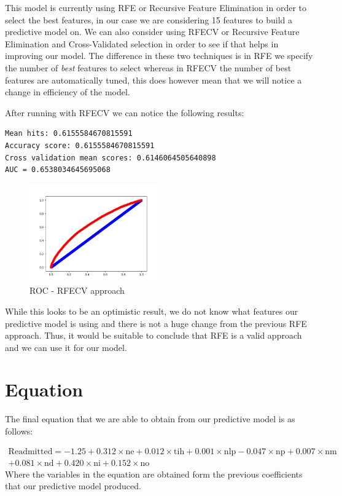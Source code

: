 \documentclass[11pt]{report}
\newcommand{\linespace}{\vspace{0.3cm}\noindent}
\begin{document}
\linespace
This model is currently using RFE or Recursive Feature Elimination in order to select the best features, in our case we are considering 15 features to build a predictive model on. We can also consider using RFECV or Recursive Feature Elimination and Cross-Validated selection in order to see if that helps in improving our model. The difference in these two techniques is in RFE we specify the number of \textit{best} features to select whereas in RFECV the number of best features are automatically tuned, this does however mean that we will notice a change in efficiency of the model.

\linespace
After running with RFECV we can notice the following results:

\begin{lstlisting}
Mean hits: 0.6155584670815591
Accuracy score: 0.6155584670815591
Cross validation mean scores: 0.6146064505640898
AUC = 0.6538034645695068
\end{lstlisting}

\begin{figure}[h!]
  \centering
\includegraphics[width=0.5\textwidth]{rfecvroc.png}
  \caption{ROC - RFECV approach}
\end{figure}
\noindent
While this looks to be an optimistic result, we do not know what features our predictive model is using and there is not a huge change from the previous RFE approach. Thus, it would be suitable to conclude that RFE is a valid approach and we can use it for our model. 

\newpage

\section{Equation}
The final equation that we are able to obtain from our predictive model is as follows:


\begin{equation*}
\begin{aligned}
	\mathrm{Readmitted} = -1.25 + 0.312\times\mathrm{ne} + 0.012\times\mathrm{tih} + 0.001\times\mathrm{nlp} - 0.047\times\mathrm{np} + 0.007\times\mathrm{nm} \\ + 0.081\times\mathrm{nd} + 0.420\times\mathrm{ni} + 0.152\times\mathrm{no}
\end{aligned}
\end{equation*}
\noindent
Where the variables in the equation are obtained form the previous coefficients that our predictive model produced. 
\end{document}
